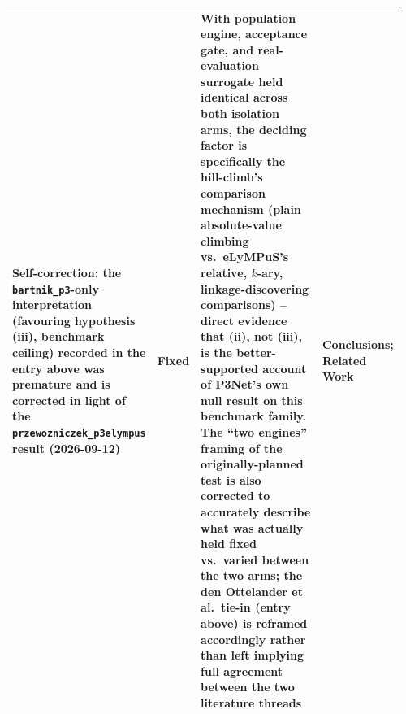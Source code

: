 \begin{longtable}{p{0.24\linewidth} p{0.08\linewidth} p{0.55\linewidth} p{0.09\linewidth}}
Self-correction: the \texttt{bartnik\_p3}-only interpretation (favouring hypothesis (iii), benchmark ceiling) recorded in the entry above was premature and is corrected in light of the \texttt{przewozniczek\_p3elympus} result (2026-09-12) & Fixed & With population engine, acceptance gate, and real-evaluation surrogate held identical across both isolation arms, the deciding factor is specifically the hill-climb's comparison mechanism (plain absolute-value climbing vs.\ eLyMPuS's relative, $k$-ary, linkage-discovering comparisons) -- direct evidence that (ii), not (iii), is the better-supported account of P3Net's own null result on this benchmark family. The ``two engines'' framing of the originally-planned test is also corrected to accurately describe what was actually held fixed vs.\ varied between the two arms; the den Ottelander et al.\ tie-in (entry above) is reframed accordingly rather than left implying full agreement between the two literature threads & Conclusions; Related Work \\
\bottomrule
\end{longtable}

\twocolumn
